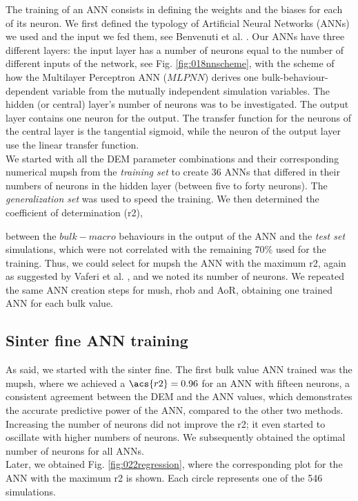 The training of an \acs{ANN} consists in defining the weights and the biases for
each of its neuron.
We first defined the typology of Artificial Neural Networks (\acs{ANNs}) we used and
the input we fed them, see Benvenuti et al. \cite{RefWorks:180}.
Our \acs{ANNs} have three different layers: the input layer has a number of neurons
equal to the number of different inputs of the network, see Fig.
\ref{fig:018nnscheme}, with the scheme of how the Multilayer Perceptron \acs{ANN} ($MLPNN$) derives one
bulk-behaviour-dependent variable from the mutually independent simulation variables.
The hidden (or central) layer's number of neurons was to be investigated. 
The output layer contains one neuron for the output.
The transfer function for the neurons of the central layer is the tangential
sigmoid, while the neuron of the output layer use the linear transfer
function.\\

We started with all the \acs{DEM} parameter combinations and their corresponding
numerical \acs{mupsh} from the \textit{training set} to create 36 \acs{ANNs} that
differed in their numbers of neurons in the hidden layer (between five to forty neurons).
The \textit{generalization set} was used to speed the training. 
We then determined the coefficient of determination (\acs{r2}), 

between the
$bulk-macro$ behaviours in the output of the \acs{ANN} and the \textit{test
set} simulations, which were not correlated with the remaining 70\% used for the
training.
Thus, we could select for \acs{mupsh} the \acs{ANN} with the maximum \acs{r2}, 
again as suggested by Vaferi et al. \cite{RefWorks:150}, and we noted its number
of neurons.
We repeated the same \acs{ANN} creation steps for \acs{mush}, \acs{rhob}
and \acs{AoR}, obtaining one trained \acs{ANN} for each bulk value. \\

\subsection{Sinter fine ANN training}
\label{subsec:sinterfineanntraining}

As said, we started with the sinter fine.
The first bulk value \acs{ANN} trained was the \acs{mupsh}, where we achieved a
$\acs{r2} = 0.96$ for an \acs{ANN} with fifteen neurons, a consistent agreement between the 
\acs{DEM} and the \acs{ANN} values, which demonstrates the accurate predictive power of
the \acs{ANN}, compared to the other two methods.
Increasing the number of neurons did not improve the \acs{r2}; it even started to
oscillate with higher numbers of neurons.
We subsequently obtained the optimal number of neurons for all \acs{ANNs}.\\
Later, we obtained Fig.
\ref{fig:022regression}, where the corresponding plot for the \acs{ANN} with the maximum \acs{r2} is shown. 
Each circle represents one of the 546 simulations.


